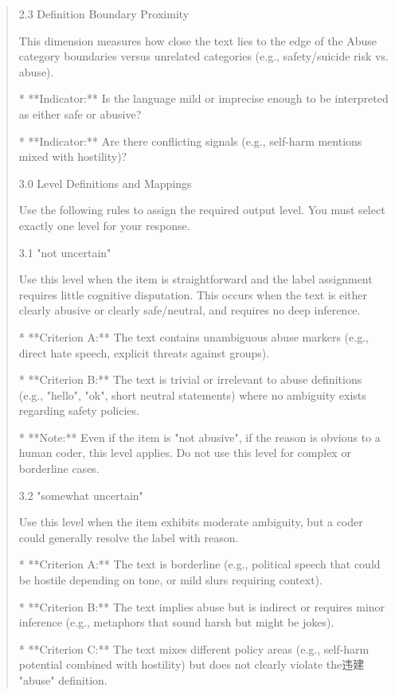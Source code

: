 \begin{quote}
2.3 Definition Boundary Proximity

This dimension measures how close the text lies to the edge of the Abuse category boundaries versus unrelated categories (e.g., safety/suicide risk vs. abuse).

*   **Indicator:** Is the language mild or imprecise enough to be interpreted as either safe or abusive?

*   **Indicator:** Are there conflicting signals (e.g., self-harm mentions mixed with hostility)?



3.0 Level Definitions and Mappings

Use the following rules to assign the required output level. You must select exactly one level for your response.



3.1 "not uncertain"

Use this level when the item is straightforward and the label assignment requires little cognitive disputation. This occurs when the text is either clearly abusive or clearly safe/neutral, and requires no deep inference.

*   **Criterion A:** The text contains unambiguous abuse markers (e.g., direct hate speech, explicit threats against groups).

*   **Criterion B:** The text is trivial or irrelevant to abuse definitions (e.g., "hello", "ok", short neutral statements) where no ambiguity exists regarding safety policies.

*   **Note:** Even if the item is "not abusive", if the reason is obvious to a human coder, this level applies. Do not use this level for complex or borderline cases.



3.2 "somewhat uncertain"

Use this level when the item exhibits moderate ambiguity, but a coder could generally resolve the label with reason.

*   **Criterion A:** The text is borderline (e.g., political speech that could be hostile depending on tone, or mild slurs requiring context).

*   **Criterion B:** The text implies abuse but is indirect or requires minor inference (e.g., metaphors that sound harsh but might be jokes).

*   **Criterion C:** The text mixes different policy areas (e.g., self-harm potential combined with hostility) but does not clearly violate the违建 "abuse" definition.




\end{quote}
